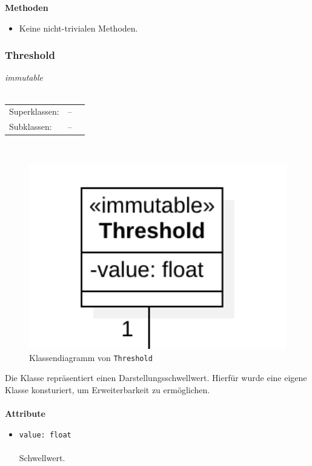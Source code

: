 \documentclass{article}
\begin{document}
\begin{itemize}
\textbf{Methoden}
\begin{itemize}\setlength\itemsep{3em}
\item[] Keine nicht-trivialen Methoden.
\end{itemize}

\newpage
\subsubsection*{\large{\textbf{Threshold}\label{cls:Threshold}}}
\textit{\flqq{}immutable\frqq}\normalsize\\\\
\begin{tabular}{lll}
 Superklassen: & --\\
 Subklassen: & --
\end{tabular}\\
\begin{figure}[H]%
    \centering
    \includegraphics[width=13cm]{entwurf/Entwurf_dokument/img/cls/model/Threshold.png}
    \caption{Klassendiagramm von \texttt{Threshold}}
\end{figure}

Die Klasse repräsentiert einen Darstellungsschwellwert. Hierfür wurde eine eigene Klasse konsturiert, um Erweiterbarkeit zu ermöglichen.
\\\\

\textbf{Attribute}
\begin{itemize}\setlength\itemsep{3em}
\item \texttt{value: float}\\\\
Schwellwert.
\\\\
\end{itemize}


\end{itemize}
\end{document}
